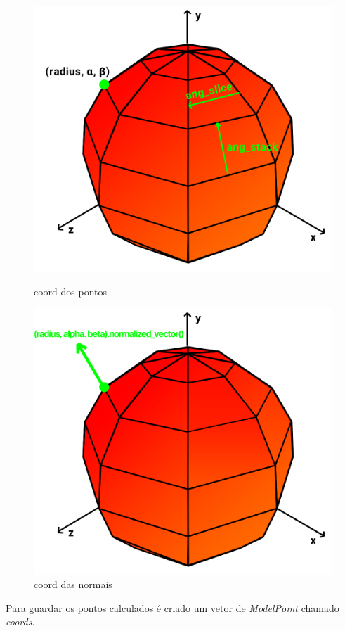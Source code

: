 \documentclass[a4paper]{report}
\begin{document}
\begin{figure}[H]
    \centering
    \begin{minipage}{0.5\textwidth}
        \centering
        \includegraphics[width=\textwidth]{images/sphere_vetores.png}
        \caption{coord dos pontos}
    \end{minipage}\hfill
    \begin{minipage}{0.5\textwidth}
        \centering
        \includegraphics[width=\textwidth]{images/esfera_normal.png}
        \caption{coord das normais}
    \end{minipage}\hfill
\end{figure}
Para guardar os pontos calculados é criado um vetor de \textit{ModelPoint}
chamado \textit{coords}.
\end{document}
